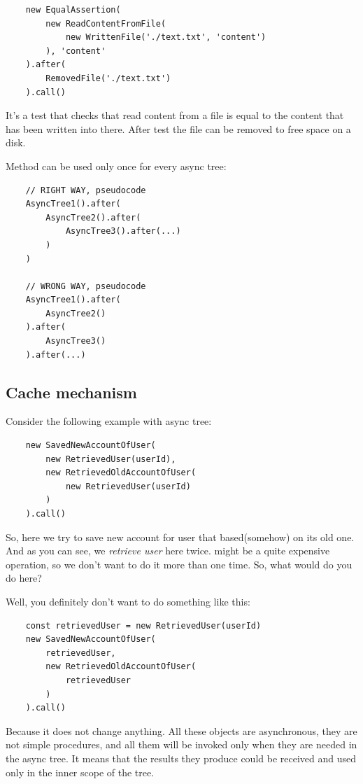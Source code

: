 \documentclass{article}
\begin{document}
\begin{verbatim}
    new EqualAssertion(
        new ReadContentFromFile(
            new WrittenFile('./text.txt', 'content')
        ), 'content'
    ).after(
        RemovedFile('./text.txt')
    ).call()
\end{verbatim}

It's a test that checks that read content from a file is equal to the content that has been written into there. After test the file can be removed to free space on a disk.

Method  can be used only once for every async tree:

\begin{verbatim}
    // RIGHT WAY, pseudocode
    AsyncTree1().after(
        AsyncTree2().after(
            AsyncTree3().after(...)
        )
    )

    // WRONG WAY, pseudocode
    AsyncTree1().after(
        AsyncTree2()
    ).after(
        AsyncTree3()
    ).after(...)
\end{verbatim}

\subsection{Cache mechanism}

Consider the following example with async tree:
\newline

\begin{verbatim}
    new SavedNewAccountOfUser(
        new RetrievedUser(userId),
        new RetrievedOldAccountOfUser(
            new RetrievedUser(userId)
        )
    ).call()
\end{verbatim}

So, here we try to save new account for user that based(somehow) on its old one. And as you can see, we \textit{retrieve user} here twice.  might be a quite expensive operation, so we don't want to do it more than one time. So, what would do you do here?

Well, you definitely don't want to do something like this:

\begin{verbatim}
    const retrievedUser = new RetrievedUser(userId)
    new SavedNewAccountOfUser(
        retrievedUser,
        new RetrievedOldAccountOfUser(
            retrievedUser
        )
    ).call()
\end{verbatim}

Because it does not change anything. All these objects are asynchronous, they are not simple procedures, and all them will be invoked only when they are needed in the async tree. It means that the results they produce could be received and used only in the inner scope of the tree.
\end{document}
